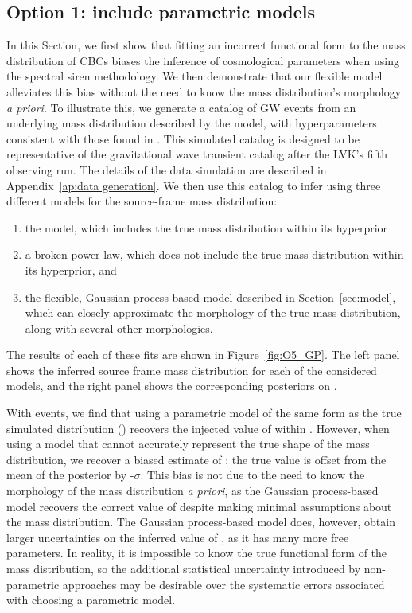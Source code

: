 \documentclass[]{aastex631}
\begin{document}
\subsection{Option 1: include parametric models}
In this Section, we first show that fitting an incorrect functional form to the mass distribution of CBCs biases the inference of cosmological parameters when using the spectral siren methodology.
We then demonstrate that our flexible model alleviates this bias without the need to know the mass distribution's morphology \emph{a priori}.
To illustrate this, we generate a catalog of GW events from an underlying mass distribution described by the \plp{} model, with hyperparameters consistent with those found in \citet{o3b_pop}.
This simulated catalog is designed to be representative of the gravitational wave transient catalog after the LVK's fifth observing run.
The details of the data simulation are described in Appendix~\ref{ap:data generation}.
We then use this catalog to infer \Ho{} using three different models for the source-frame mass distribution:
\begin{enumerate}
    \item the \plp{} model, which includes the true mass distribution within its hyperprior
    \item a broken power law, which does not include the true mass distribution within its hyperprior, and 
    \item the flexible, Gaussian process-based model described in Section~\ref{sec:model}, which can closely approximate the morphology of the true mass distribution, along with several other morphologies.
\end{enumerate}
The results of each of these fits are shown in Figure~\ref{fig:O5_GP}. 
The left panel shows the inferred source frame mass distribution for each of the considered models, and the right panel shows the corresponding posteriors on \Ho{}.

With events, we find that using a parametric model of the same form as the true simulated distribution (\plp) recovers the injected value of \Ho{} within .
However, when using a model that cannot accurately represent the true shape of the mass distribution, we recover a biased estimate of \Ho: the true value is offset from the mean of the posterior by -$\sigma$.
This bias is not due to the need to know the morphology of the mass distribution \emph{a priori}, as the Gaussian process-based model recovers the correct value of \Ho{} despite making minimal assumptions about the mass distribution.
The Gaussian process-based model does, however, obtain larger uncertainties on the inferred value of \Ho, as it has many more free parameters. 
In reality, it is impossible to know the true functional form of the mass distribution, so the additional statistical uncertainty introduced by non-parametric approaches may be desirable over the systematic errors associated with choosing a parametric model.
\end{document}
